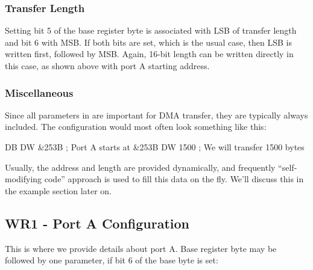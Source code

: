 \subsubsection{Transfer Length}{

Setting bit 5 of the base register byte is associated with LSB of transfer length and bit 6 with MSB. If both bits are set, which is the usual case, then LSB is written first, followed by MSB. Again, 16-bit length can be written directly in this case, as shown above with port A starting address.


\subsubsection{Miscellaneous}

Since all parameters in  are important for DMA transfer, they are typically always included. The configuration would most often look something like this:

\begin{tcblisting}{}
	DB %
	DW &253B          ; Port A starts at &253B
	DW 1500           ; We will transfer 1500 bytes
\end{tcblisting}

Usually, the address and length are provided dynamically, and frequently ``self-modifying code'' approach is used to fill this data on the fly. We'll discuss this in the example section later on.



\pagebreak
\subsection{WR1 - Port A Configuration}


This is where we provide details about port A. Base register byte may be followed by one parameter, if bit 6 of the base byte is set:

}
